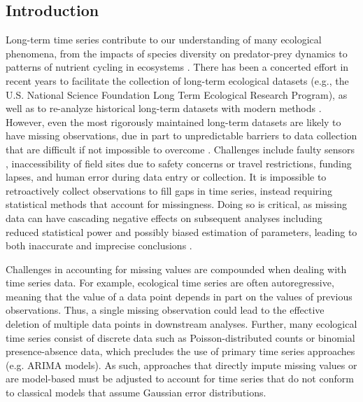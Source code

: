\documentclass[12pt,english]{article} %
\begin{document}
\begin{linenumbers}
\begin{spacing}{1.9}
\begin{flushleft}
\vspace{-2.5em}
\section*{Introduction} 
\vspace{-1.5em}

\hspace{1em} Long-term time series contribute to our understanding of many ecological phenomena, from the impacts of species diversity on predator-prey dynamics to patterns of nutrient cycling in ecosystems \citep{Hughes2017, Likens1970, Sinclair2003}. There has been a concerted effort in recent years to facilitate the collection of long-term ecological datasets (e.g., the U.S. National Science Foundation Long Term Ecological Research Program), as well as to re-analyze historical long-term datasets with modern methods \citep{Adler2009, Buma2017}. However, even the most rigorously maintained long-term datasets are likely to have missing observations, due in part to unpredictable barriers to data collection that are difficult if not impossible to overcome \citep{lopucki2022handling, nakagawa_missing_2008}. Challenges include faulty sensors \citep{hossie_confronting_2021}, inaccessibility of field sites due to safety concerns or travel restrictions, funding lapses, and human error during data entry or collection. It is impossible to retroactively collect observations to fill gaps in time series, instead requiring statistical methods that account for missingness. Doing so is critical, as missing data can have cascading negative effects on subsequent analyses including reduced statistical power \citep{kang2013prevention, moritz_imputets_2017} and possibly biased estimation of parameters, leading to both inaccurate and imprecise conclusions \citep{aleryani2018dealing, kim_transcending_2018, junger_imputation_2015}.

\hspace{1em} 
Challenges in accounting for missing values are compounded when dealing with time series data. For example, ecological time series are often autoregressive, meaning that the value of a data point depends in part on the values of previous observations. %
Thus, a single missing observation could lead to the effective deletion of multiple data points in downstream analyses. Further, many ecological time series consist of discrete data such as Poisson-distributed counts or binomial presence-absence data, which precludes the use of primary time series approaches (e.g. ARIMA models). As such, approaches that directly impute missing values or are model-based must be adjusted to account for time series that do not conform to classical models that assume Gaussian error distributions.


\end{flushleft}
\end{spacing}
\end{linenumbers}
\end{document}
